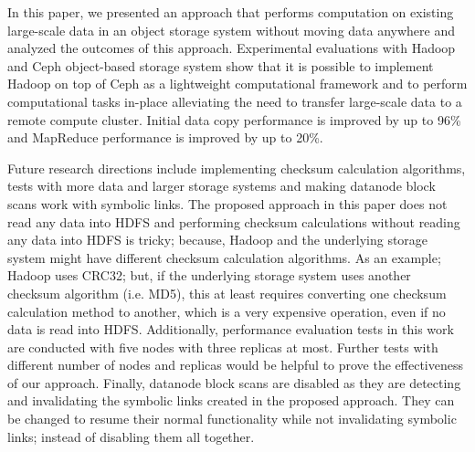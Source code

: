\label{conclusions}
In this paper, we presented an approach that performs computation
on existing large-scale data in an object storage system without moving
data anywhere and analyzed the outcomes of this approach. Experimental
evaluations with Hadoop and Ceph object-based storage system show that
it is possible to implement Hadoop on top of Ceph as a lightweight computational
framework and to perform computational tasks in-place alleviating the need to transfer
large-scale data to a remote compute cluster. Initial data copy
performance is improved by up to 96\% and MapReduce performance is
improved by up to 20\%.

Future research directions include implementing checksum calculation algorithms,
tests with more data and larger storage systems and making datanode block scans
work with symbolic links. The proposed approach in this paper
does not read any data into HDFS and performing checksum calculations without
reading any data into HDFS is tricky; because, Hadoop and the underlying storage
system might have different checksum calculation algorithms. As an example;
Hadoop uses CRC32; but, if the underlying storage system uses another checksum
algorithm (i.e. MD5), this at least requires converting one checksum calculation
method to another, which is a very expensive operation, even if no data is read
into HDFS. Additionally, performance evaluation tests in this work are conducted
with five nodes with three replicas at most. Further tests with different number
of nodes and replicas would be helpful to prove the effectiveness of our approach.
Finally, datanode block scans are disabled as they are detecting and invalidating
the symbolic links created in the proposed approach. They can be changed to resume their
normal functionality while not invalidating symbolic links; instead of disabling
them all together.
